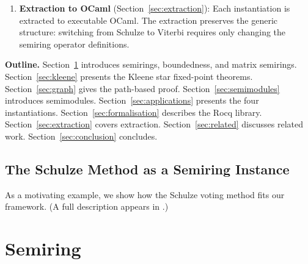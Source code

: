 \documentclass[a4paper,UKenglish,cleveref, autoref, thm-restate, anonymous]{lipics-v2021}
\begin{document}
\begin{enumerate}
\item \textbf{Extraction to OCaml} (Section~\ref{sec:extraction}):
Each instantiation is extracted to executable OCaml. The extraction
preserves the generic structure: switching from Schulze to Viterbi
requires only changing the semiring operator definitions.
\end{enumerate}

\textbf{Outline.}
Section~\ref{sec:semiring} introduces semirings, boundedness, and
matrix semirings. Section~\ref{sec:kleene} presents the Kleene star
fixed-point theorems. Section~\ref{sec:graph} gives the path-based
proof. Section~\ref{sec:semimodules} introduces semimodules.
Section~\ref{sec:applications} presents the four instantiations.
Section~\ref{sec:formalisation} describes the Rocq library.
Section~\ref{sec:extraction} covers extraction.
Section~\ref{sec:related} discusses related work.
Section~\ref{sec:conclusion} concludes.

\subsection{The Schulze Method as a Semiring Instance}
\label{sec:schulze-overview}

As a motivating example, we show how the Schulze voting method fits
our framework. (A full description appears in \cite{schulze2011new}.)



\section{Semiring}\label{sec:semiring}
\end{document}
